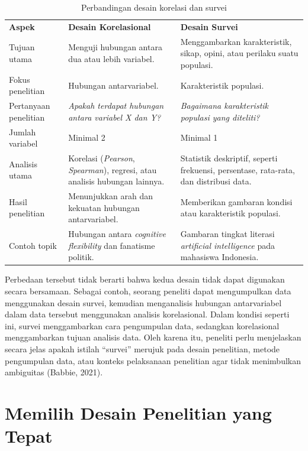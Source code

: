 \documentclass[
  indonesian,
  letterpaper,
  DIV=11,
  numbers=noendperiod]{scrreprt}
\begin{document}
\begin{longtable}[]{@{}
  >{\raggedright\arraybackslash}p{}
  >{\raggedright\arraybackslash}p{}
  >{\raggedright\arraybackslash}p{}@{}}
\caption{Perbandingan desain korelasi dan
survei}\label{tbl-korelvssurvei}\tabularnewline
\toprule\noalign{}
\endfirsthead
\endhead
\bottomrule\noalign{}
\endlastfoot
\textbf{Aspek} & \textbf{Desain Korelasional} & \textbf{Desain
Survei} \\
Tujuan utama & Menguji hubungan antara dua atau lebih variabel. &
Menggambarkan karakteristik, sikap, opini, atau perilaku suatu
populasi. \\
Fokus penelitian & Hubungan antarvariabel. & Karakteristik populasi. \\
Pertanyaan penelitian & \emph{Apakah terdapat hubungan antara variabel X
dan Y?} & \emph{Bagaimana karakteristik populasi yang diteliti?} \\
Jumlah variabel & Minimal 2 & Minimal 1 \\
Analisis utama & Korelasi (\emph{Pearson}, \emph{Spearman}), regresi,
atau analisis hubungan lainnya. & Statistik deskriptif, seperti
frekuensi, persentase, rata-rata, dan distribusi data. \\
Hasil penelitian & Menunjukkan arah dan kekuatan hubungan antarvariabel.
& Memberikan gambaran kondisi atau karakteristik populasi. \\
Contoh topik & Hubungan antara \emph{cognitive flexibility} dan
fanatisme politik. & Gambaran tingkat literasi \emph{artificial
intelligence} pada mahasiswa Indonesia. \\
\end{longtable}

Perbedaan tersebut tidak berarti bahwa kedua desain tidak dapat
digunakan secara bersamaan. Sebagai contoh, seorang peneliti dapat
mengumpulkan data menggunakan desain survei, kemudian menganalisis
hubungan antarvariabel dalam data tersebut menggunakan analisis
korelasional. Dalam kondisi seperti ini, survei menggambarkan cara
pengumpulan data, sedangkan korelasional menggambarkan tujuan analisis
data. Oleh karena itu, peneliti perlu menjelaskan secara jelas apakah
istilah ``survei'' merujuk pada desain penelitian, metode pengumpulan
data, atau konteks pelaksanaan penelitian agar tidak menimbulkan
ambiguitas (Babbie, 2021).

\section{Memilih Desain Penelitian yang
Tepat}\label{memilih-desain-penelitian-yang-tepat}
\end{document}
